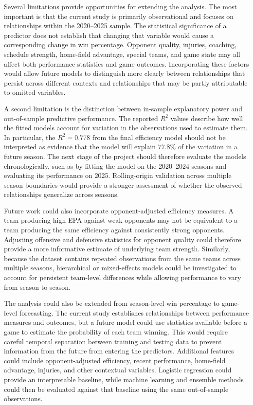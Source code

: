 \documentclass[11pt]{article}
\begin{document}
Several limitations provide opportunities for extending the analysis. The most important is that the current study is primarily observational and focuses on relationships within the 2020--2025 sample. The statistical significance of a predictor does not establish that changing that variable would cause a corresponding change in win percentage. Opponent quality, injuries, coaching, schedule strength, home-field advantage, special teams, and game state may all affect both performance statistics and game outcomes. Incorporating these factors would allow future models to distinguish more clearly between relationships that persist across different contexts and relationships that may be partly attributable to omitted variables.

A second limitation is the distinction between in-sample explanatory power and out-of-sample predictive performance. The reported $R^2$ values describe how well the fitted models account for variation in the observations used to estimate them. In particular, the $R^2=0.778$ from the final efficiency model should not be interpreted as evidence that the model will explain 77.8\% of the variation in a future season. The next stage of the project should therefore evaluate the models chronologically, such as by fitting the model on the 2020--2024 seasons and evaluating its performance on 2025. Rolling-origin validation across multiple season boundaries would provide a stronger assessment of whether the observed relationships generalize across seasons.

Future work could also incorporate opponent-adjusted efficiency measures. A team producing high EPA against weak opponents may not be equivalent to a team producing the same efficiency against consistently strong opponents. Adjusting offensive and defensive statistics for opponent quality could therefore provide a more informative estimate of underlying team strength. Similarly, because the dataset contains repeated observations from the same teams across multiple seasons, hierarchical or mixed-effects models could be investigated to account for persistent team-level differences while allowing performance to vary from season to season.

The analysis could also be extended from season-level win percentage to game-level forecasting. The current study establishes relationships between performance measures and outcomes, but a future model could use statistics available before a game to estimate the probability of each team winning. This would require careful temporal separation between training and testing data to prevent information from the future from entering the predictors. Additional features could include opponent-adjusted efficiency, recent performance, home-field advantage, injuries, and other contextual variables. Logistic regression could provide an interpretable baseline, while machine learning and ensemble methods could then be evaluated against that baseline using the same out-of-sample observations.
\end{document}
